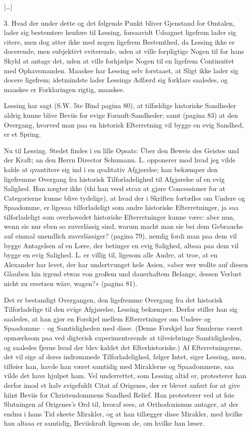 \documentclass[12pt,a4paper]{article}
\begin{document}
[…]

3. Hvad der under dette og det følgende Punkt bliver Gjenstand for Omtalen, lader sig bestemtere henføre til Lessing, forsaavidt Udsagnet ligefrem lader sig citere, men dog atter ikke med nogen ligefrem Bestemthed, da Lessing ikke er docerende, men subjektivt eviterende, uden at ville forpligtige Nogen til for hans Skyld at antage det, uden at ville forhjælpe Nogen til en ligefrem Continuitet med Ophavsmanden. Maaskee har Lessing selv forstaaet, at Sligt ikke lader sig docere ligefrem; idetmindste lader Lessings Adfærd sig forklare saaledes, og maaskee er Forklaringen rigtig, maaskee.

Lessing har sagt (S.W. 5te Bind pagina 80), at tilfældige historiske Sandheder aldrig kunne blive Beviis for evige Fornuft-Sandheder; samt (pagina 83) at den Overgang, hvorved man paa en historisk Efterretning vil bygge en evig Sandhed, er et Spring.

Nu til Lessing. Stedet findes i en lille Opsats: Über den Beweis des Geistes und der Kraft; an den Herrn Director Schumann. L. opponerer mod hvad jeg vilde kalde at qvantitere sig ind i en qvalitativ Afgjørelse; han bekæmper den ligefremme Overgang fra historisk Tilforladelighed til Afgjørelse af en evig Salighed. Han nægter ikke (thi han veed strax at gjøre Concessioner for at Categorierne kunne blive tydelige), at hvad der i Skriften fortælles om Undere og Spaadomme, er ligesaa tilforladeligt som andre historiske Efterretninger, ja saa tilforladeligt som overhovedet historiske Efterretninger kunne være: aber nun, wenn sie nur eben so zuverlässig sind, warum macht man sie bei dem Gebrauche auf einmal unendlich zuverlässiger? (pagina 79), nemlig fordi man paa dem vil bygge Antagelsen af en Lære, der betinger en evig Salighed, altsaa paa dem vil bygge en evig Salighed. L. er villig til, ligesom alle Andre, at troe, at en Alexander har levet, der har undertvunget hele Asien, »aber wer wollte auf diesen Glauben hin irgend etwas von großem und dauerhaftem Belange, dessen Verlust nicht zu ersetzen wäre, wagen?« (pagina 81).

Det er bestandigt Overgangen, den ligefremme Overgang fra det historisk Tilforladelige til den evige Afgjørelse, Lessing bekæmper. Derfor stiller han sig saaledes, at han gjør en Forskjel mellem Efterretninger om Undere og Spaadomme – og Samtidigheden med disse. (Denne Forskjel har Smulerne været opmærksom paa ved digterisk experimenterende at tilveiebringe Samtidigheden, og saaledes fjerne hvad der blev kaldet det Efterhistoriske.) Af Efterretningerne, det vil sige af deres indrømmede Tilforladelighed, følger Intet, siger Lessing, men, tilføier han, havde han været samtidig med Miraklerne og Spaadommene, saa vilde det have hjulpet ham. Vel underrettet, som Lessing altid er, protesterer han derfor imod et halv svigefuldt Citat af Origenes, der er blevet anført for at give hiint Beviis for Christendommens Sandhed Relief. Han protesterer ved at føie Slutningen af Origenes's Ord til, hvoraf sees, at Orthodoxismus antager, at der endnu i hans Tid skeete Mirakler, og at han tillægger disse Mirakler, med hvilke han altsaa er samtidig, Beviiskraft ligesom de, om hvilke han læser.
\end{document}
